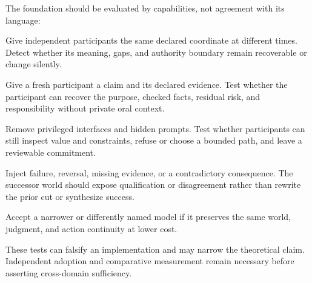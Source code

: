 The foundation should be evaluated by capabilities, not agreement with its
language:

\begin{description}[leftmargin=*,style=nextline]
  \item[Fact continuity.]
    Give independent participants the same declared coordinate at different
    times. Detect whether its meaning, gaps, and authority boundary remain
    recoverable or change silently.
  \item[Reliance test.]
    Give a fresh participant a claim and its declared evidence. Test whether
    the participant can recover the purpose, checked facts, residual risk, and
    responsibility without private oral context.
  \item[Cooperation-independence test.]
    Remove privileged interfaces and hidden prompts. Test whether participants
    can still inspect value and constraints, refuse or choose a bounded path,
    and leave a reviewable commitment.
  \item[Loop-integrity test.]
    Inject failure, reversal, missing evidence, or a contradictory consequence.
    The successor world should expose qualification or disagreement rather
    than rewrite the prior cut or synthesize success.
  \item[Alternative-kernel test.]
    Accept a narrower or differently named model if it preserves the same
    world, judgment, and action continuity at lower cost.
\end{description}

These tests can falsify an implementation and may narrow the theoretical
claim. Independent adoption and comparative measurement remain necessary
before asserting cross-domain sufficiency.
